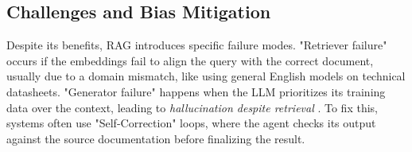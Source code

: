 \subsection{Challenges and Bias Mitigation}
Despite its benefits, RAG introduces specific failure modes. "Retriever failure" occurs if the embeddings fail to align the query with the correct document, usually due to a domain mismatch, like using general English models on technical datasheets. "Generator failure" happens when the LLM prioritizes its training data over the context, leading to \textit{hallucination despite retrieval} \cite{Gao2024RetrievalAugmentedGN}. To fix this, systems often use "Self-Correction" loops, where the agent checks its output against the source documentation before finalizing the result.
